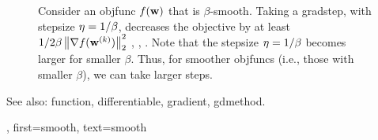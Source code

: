 {{\begin{figure}[H]
\begin{center}
	    	\end{center}
	    	\caption{Consider an \gls{objfunc} $f({\bf w})$ that is $\beta$-smooth. 
	    		Taking a \gls{gradstep}, with \gls{stepsize} $\eta = 1/\beta$, decreases the 
	    		objective by at least ${1}/{2\beta}\left\Vert {\nabla f({\bf w}^{(k)})} \right\Vert_{2}^{2}$ \cite{nesterov04}, \cite{CvxBubeck2015}, \cite{CvxAlgBertsekas}. 
	    		Note that the \gls{stepsize} $\eta = 1/\beta$ becomes larger for smaller $\beta$. Thus, 
	    		for smoother \glspl{objfunc} (i.e., those with smaller $\beta$), 
				we can take larger steps. \label{fig_gd_smooth_dict}}
	    	\end{figure}
		See also: \gls{function}, \gls{differentiable}, \gls{gradient},  \gls{gdmethod}.},
	first={smooth},
	text={smooth}
}

